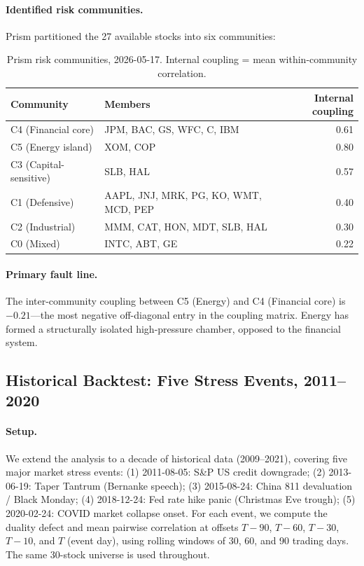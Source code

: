 \documentclass[11pt]{article}
\begin{document}
\paragraph{Identified risk communities.}
Prism partitioned the 27 available stocks into six communities:

\begin{table}[h]
\centering
\caption{Prism risk communities, 2026-05-17. Internal coupling =
mean within-community correlation.}
\label{tab:communities}
\begin{tabular}{llr}
\toprule
Community & Members & Internal coupling \\
\midrule
C4 (Financial core) & JPM, BAC, GS, WFC, C, IBM & 0.61 \\
C5 (Energy island)  & XOM, COP                  & 0.80 \\
C3 (Capital-sensitive) & SLB, HAL               & 0.57 \\
C1 (Defensive)      & AAPL, JNJ, MRK, PG, KO, WMT, MCD, PEP & 0.40 \\
C2 (Industrial)     & MMM, CAT, HON, MDT, SLB, HAL & 0.30 \\
C0 (Mixed)          & INTC, ABT, GE             & 0.22 \\
\bottomrule
\end{tabular}
\end{table}

\paragraph{Primary fault line.}
The inter-community coupling between C5 (Energy) and C4 (Financial core)
is $-0.21$---the most negative off-diagonal entry in the coupling matrix.
Energy has formed a structurally isolated high-pressure chamber,
opposed to the financial system.

\subsection{Historical Backtest: Five Stress Events, 2011--2020}
\label{sec:backtest}

\paragraph{Setup.}
We extend the analysis to a decade of historical data (2009--2021),
covering five major market stress events:
(1) 2011-08-05: S\&P US credit downgrade;
(2) 2013-06-19: Taper Tantrum (Bernanke speech);
(3) 2015-08-24: China 811 devaluation / Black Monday;
(4) 2018-12-24: Fed rate hike panic (Christmas Eve trough);
(5) 2020-02-24: COVID market collapse onset.
For each event, we compute the duality defect and mean pairwise
correlation at offsets $T{-}90$, $T{-}60$, $T{-}30$, $T{-}10$, and $T$
(event day), using rolling windows of 30, 60, and 90 trading days.
The same 30-stock universe is used throughout.
\end{document}
